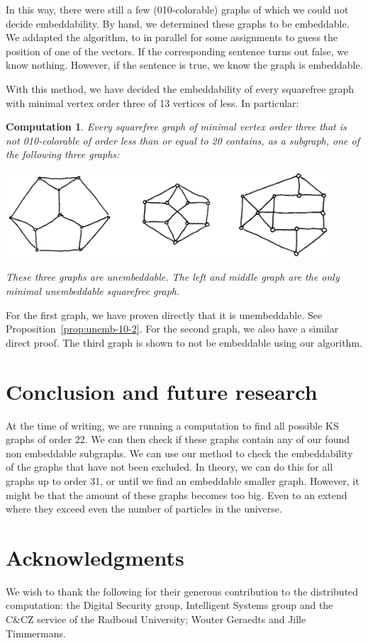 \documentclass[a4paper]{article}
\newcounter{main}
\newtheorem{comp}[main]{Computation}
\theoremstyle{definition}
\theoremstyle{remark}
\begin{document}
In this way, there were still a few (010-colorable) graphs of which
we could not decide embeddability.
By hand, we determined these graphs to be embeddable.
We addapted the algorithm, to in parallel for some assignments
to guess the position of one of the vectors.  If the corresponding
sentence turns out false, we know nothing.  However,
if the sentence is true, we know the graph is embeddable.

With this method, we have decided the embeddability of every squarefree
graph with minimal vertex order three of 13 vertices of less.
In particular:
\begin{comp}
    Every squarefree graph of minimal vertex order three
    that is not 010-colorable
    of order less than or equal to 20
    contains, as a subgraph, one of the following three graphs:
    \begin{center}
        \includegraphics[width=120mm]{graphs/unemb-base-20.jpg}
    \end{center}
    These three graphs are unembeddable.  The left and middle graph
    are the only minimal unembeddable squarefree graph.
\end{comp}
For the first graph, we have proven directly that it is unembeddable.
See Proposition~\ref{prop:unemb-10-2}.
For the second graph, we also have a similar direct proof. The third graph is shown to not be embeddable using our algorithm.

\section{Conclusion and future research}
At the time of writing, we are running a computation to find all possible KS graphs of order 22. We can then check if these graphs contain any of our found non embeddable subgraphs. We can use our method to check the embeddability of the graphs that have not been excluded. In theory, we can do this for all graphs up to order 31, or until we find an embeddable smaller graph. However, it might be that the amount of these graphs becomes too big. Even to an extend where they exceed even the number of particles in the universe.


\section{Acknowledgments}
We wish to thank the following for their generous contribution to the
distributed computation:
    the Digital Security group, Intelligent Systems group
    and the C\&CZ service of the Radboud University;
    Wouter Geraedts and
    Jille Timmermans.
\end{document}
